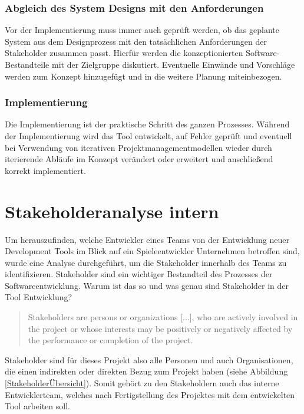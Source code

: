 \documentclass[pagesize, paper=a4, fontsize=12pt, titlepage=true, headings=small, headnosepline, abstractoff, liststotoc, nochapterprefix, plainheadsepline, twoside]{scrreprt}
\begin{document}
\subsubsection{Abgleich des System Designs mit den Anforderungen}
Vor der Implementierung muss immer auch geprüft werden, ob das geplante System aus dem Designprozess mit den tatsächlichen Anforderungen der Stakeholder zusammen passt. Hierfür werden die konzeptionierten Software-Bestandteile mit der Zielgruppe diskutiert. Eventuelle Einwände und Vorschläge werden zum Konzept hinzugefügt und in die weitere Planung miteinbezogen.

\subsubsection{Implementierung}
Die Implementierung ist der praktische Schritt des ganzen Prozesses. Während der Implementierung wird das Tool entwickelt, auf Fehler geprüft und eventuell bei Verwendung von iterativen Projektmanagementmodellen wieder durch iterierende Abläufe im Konzept verändert oder erweitert und anschließend korrekt implementiert.

\section{Stakeholderanalyse intern}
Um herauszufinden, welche Entwickler eines Teams von der Entwicklung neuer Development Tools im Blick auf ein Spieleentwickler Unternehmen betroffen sind, wurde eine Analyse durchgeführt, um die Stakeholder innerhalb des Teams zu identifizieren. Stakeholder sind ein wichtiger Bestandteil des Prozesses der Softwareentwicklung. Warum ist das so und was genau sind Stakeholder in der Tool Entwicklung?
\begin{quote}
\glqq Stakeholders are persons or organizations [...], who are actively involved in the project or whose interests may be positively or negatively affected
by the performance or completion of the project.\grqq{} 
\end{quote}
Stakeholder sind für dieses Projekt also alle Personen und auch Organisationen, die einen indirekten oder direkten Bezug zum Projekt haben (siehe Abbildung \ref{StakeholderÜbersicht}). Somit gehört zu den Stakeholdern auch das interne Entwicklerteam, welches nach Fertigstellung des Projektes mit dem entwickelten Tool arbeiten soll.
\end{document}
